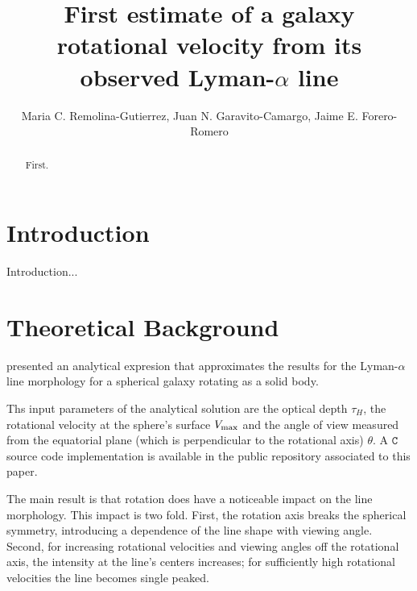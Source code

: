 \documentclass{emulateapj}
\newcommand{\ly}{{\ifmmode{{\rm Ly}\alpha~}\else{Ly$\alpha$~}\fi}}
\begin{document}
\title{First estimate of a galaxy rotational velocity from
  its observed Lyman-$\alpha$ line} 


\author{ Maria C. Remolina-Gutierrez, Juan N. Garavito-Camargo, Jaime
  E. Forero-Romero}  

\begin{abstract}
First.
\end{abstract}


\section{Introduction}
\label{sec:intro}

Introduction... \\ 
\cite{Garavito14}


\section{Theoretical Background}
\label{sec:theo}


\cite{Garavito14} presented an analytical expresion that approximates
the results for the Lyman-$\alpha$ line morphology for a spherical galaxy
rotating as a solid body.

Ths input parameters of the analytical solution are the optical depth
$\tau_{H}$, the rotational velocity at the sphere's surface $V_{\rm
  max}$ and the angle of view measured from the equatorial plane
(which is perpendicular to the rotational axis) $\theta$. 
A $\texttt{C}$ source code implementation is available in the public
repository associated to this paper.

The main result \cite{Garavito14} is that rotation does have a
noticeable impact on the \ly line morphology.
This impact is two fold. 
First, the rotation axis breaks the spherical symmetry, introducing a
dependence of the line shape with viewing angle.
Second, for increasing rotational velocities and viewing angles off
the rotational axis, the intensity at the line's centers increases;
for sufficiently high rotational velocities the line becomes single peaked. 
 
\end{document}
